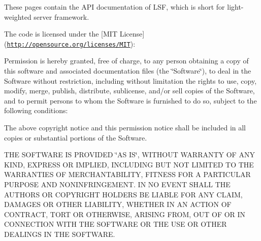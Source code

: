 These pages contain the API documentation of LSF, which is short for light-\/weighted server framework.

The code is licensed under the \mbox{[}MIT License\mbox{]}(\href{http://opensource.org/licenses/MIT}{\tt http://opensource.org/licenses/MIT}): \par
 Permission is hereby granted, free of charge, to any person obtaining a copy of this software and associated documentation files (the \char`\"{}Software\char`\"{}), to deal in the Software without restriction, including without limitation the rights to use, copy, modify, merge, publish, distribute, sublicense, and/or sell copies of the Software, and to permit persons to whom the Software is furnished to do so, subject to the following conditions: \par
 The above copyright notice and this permission notice shall be included in all copies or substantial portions of the Software. \par
 THE SOFTWARE IS PROVIDED \char`\"{}AS IS\char`\"{}, WITHOUT WARRANTY OF ANY KIND, EXPRESS OR IMPLIED, INCLUDING BUT NOT LIMITED TO THE WARRANTIES OF MERCHANTABILITY, FITNESS FOR A PARTICULAR PURPOSE AND NONINFRINGEMENT. IN NO EVENT SHALL THE AUTHORS OR COPYRIGHT HOLDERS BE LIABLE FOR ANY CLAIM, DAMAGES OR OTHER LIABILITY, WHETHER IN AN ACTION OF CONTRACT, TORT OR OTHERWISE, ARISING FROM, OUT OF OR IN CONNECTION WITH THE SOFTWARE OR THE USE OR OTHER DEALINGS IN THE SOFTWARE. 
